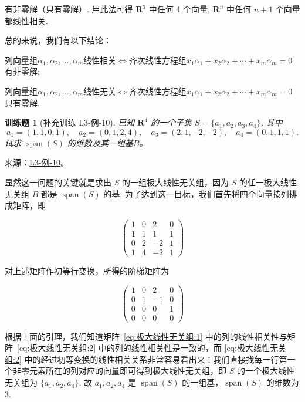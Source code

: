 \documentclass[UTF8,12pt,a4paper,fontset=fandol]{ctexart}
\newtheorem{exercise}{训练题}[section]
\begin{document}
\begin{solve}
              有非零解（只有零解）. 用此法可得 $\mathbf{R}^3$ 中任何 4 个向量, $\mathbf{R}^n$ 中任何 $n + 1$ 个向量都线性相关.

              总的来说，我们有以下结论：

              列向量组$\alpha_1,\alpha_2,\ldots,\alpha_m$线性相关$\iff$齐次线性方程组$x_1\alpha_1+x_2\alpha_2+\cdots+x_m\alpha_m=0$有非零解;

              列向量组$\alpha_1,\alpha_2,\ldots,\alpha_m$线性无关$\iff$齐次线性方程组$x_1\alpha_1+x_2\alpha_2+\cdots+x_m\alpha_m=0$只有零解.
\end{solve}

\begin{exercise}[补充训练 L3-例-10]\label{prob:L3-例-10}
已知 $\mathbf{R}^4$ 的一个子集 $S = \{a_1, a_2, a_3, a_4\}$, 其中
    \[
        a_1 = (1,1,0,1), \quad a_2 = (0,1,2,4), \quad
        a_3 = (2,1,-2,-2), \quad a_4 = (0,1,1,1).
    \]
    试求 $\operatorname{span}(S)$ 的维数及其一组基$B$。
\end{exercise}
\noindent 来源：\href{https://github.com/yhwu-is/Linear-Algebra-Left-Undone/blob/new/%E8%AE%B2%E4%B9%89/%E4%B8%93%E9%A2%98/3%20%E6%9C%89%E9%99%90%E7%BB%B4%E7%BA%BF%E6%80%A7%E7%A9%BA%E9%97%B4.tex}{L3-例-10}。
\begin{solve}
显然这一问题的关键就是求出 $S$ 的一组极大线性无关组，因为 $S$ 的任一极大线性无关组 $B$ 都是 $\operatorname{span}(S)$ 的基. 为了达到这一目标，我们首先将四个向量按列排成矩阵，即

    \begin{equation} \label{eq:极大线性无关组:1}
        \begin{pmatrix}
            1 & 0 & 2  & 0 \\
            1 & 1 & 1  & 1 \\
            0 & 2 & -2 & 1 \\
            1 & 4 & -2 & 1
        \end{pmatrix}
    \end{equation}

    对上述矩阵作初等行变换，所得的阶梯矩阵为

    \begin{equation} \label{eq:极大线性无关组:2}
        \begin{pmatrix}
            1 & 0 & 2  & 0 \\
            0 & 1 & -1 & 0 \\
            0 & 0 & 0  & 1 \\
            0 & 0 & 0  & 0
        \end{pmatrix}
    \end{equation}

    根据上面的引理，我们知道矩阵~\eqref{eq:极大线性无关组:1} 中的列的线性相关性与矩阵~\eqref{eq:极大线性无关组:2} 中的列的线性相关性是一致的，而 \eqref{eq:极大线性无关组:2} 中的经过初等变换的线性相关关系非常容易看出来：我们直接找每一行第一个非零元素所在的列对应的向量即可得到极大线性无关组，即 $S$ 的一个极大线性无关组为 $\{a_1, a_2, a_4\}$. 故 $a_1, a_2, a_4$ 是 $\operatorname{span}(S)$ 的一组基，$\operatorname{span}(S)$ 的维数为 3.
\end{solve}
\end{document}
